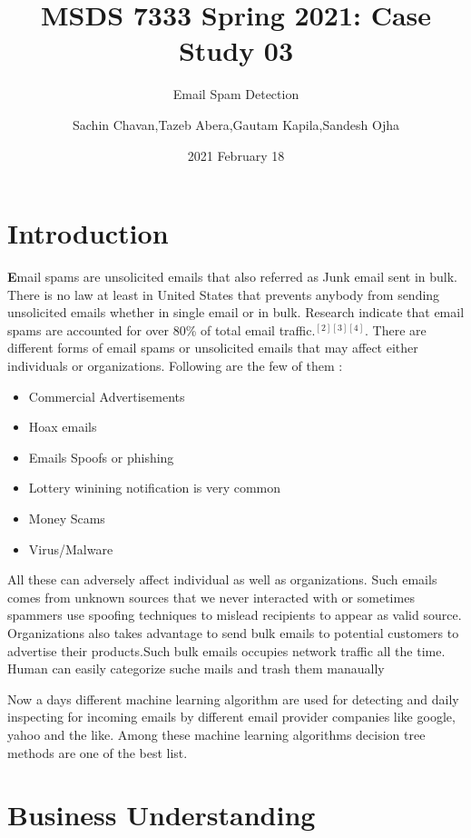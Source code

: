 \documentclass[
]{article}
\title{MSDS 7333 Spring 2021: Case Study 03}
\subtitle{Email Spam Detection}
\author{Sachin Chavan,Tazeb Abera,Gautam Kapila,Sandesh Ojha}
\date{2021 February 18}
\providecommand{\tightlist}{%
  \setlength{\itemsep}{0pt}\setlength{\parskip}{0pt}}
\begin{document}
\maketitle

\hypertarget{introduction}{%
\section{Introduction}\label{introduction}}

\textbf{E}mail spams are unsolicited emails that also referred as Junk
email sent in bulk. There is no law at least in United States that
prevents anybody from sending unsolicited emails whether in single email
or in bulk. Research indicate that email spams are accounted for over
80\% of total email traffic.\(^{[2][3][4]}\). There are different forms
of email spams or unsolicited emails that may affect either individuals
or organizations. Following are the few of them :

\begin{itemize}
\tightlist
\item
  Commercial Advertisements
\item
  Hoax emails
\item
  Emails Spoofs or phishing
\item
  Lottery winining notification is very common
\item
  Money Scams
\item
  Virus/Malware
\end{itemize}

All these can adversely affect individual as well as organizations. Such
emails comes from unknown sources that we never interacted with or
sometimes spammers use spoofing techniques to mislead recipients to
appear as valid source. Organizations also takes advantage to send bulk
emails to potential customers to advertise their products.Such bulk
emails occupies network traffic all the time. Human can easily
categorize suche mails and trash them manaually

Now a days different machine learning algorithm are used for detecting
and daily inspecting for incoming emails by different email provider
companies like google, yahoo and the like. Among these machine learning
algorithms decision tree methods are one of the best list.

\newpage

\hypertarget{business-understanding}{%
\section{Business Understanding}\label{business-understanding}}
\end{document}

